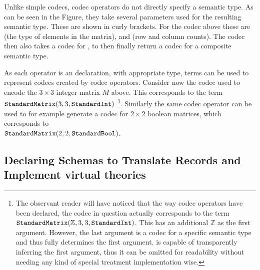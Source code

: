 Unlike simple codecs, codec operators do not directly specify a semantic type. 
As can be seen in the Figure, they take several parameters used for the resulting semantic type. 
These are shown in curly brackets. 
For the  codec above these are  (the type of elements in the matrix),  and  (row and column counts).
The codec then also takes a codec for , to then finally return a codec for a composite semantic type. 

As each operator is an \mmt declaration, with appropriate type, \mmt terms can be used to represent codecs created by codec operators. 
Consider now the codec used to encode the $3 \times 3$ integer matrix $M$ above. 
This corresponds to the \mmt term \\$\plaintt{StandardMatrix}(3, 3, \plaintt{StandardInt})$ \footnote{
  The observant reader will have noticed that the way codec operators have been declared, the codec in question actually corresponds to the term $\plaintt{StandardMatrix}(\mathbb{Z}, 3, 3, \plaintt{StandardInt})$. 
  This has an additional $\mathbb{Z}$ as the first argument. 
  However, the last argument is a codec for a specific semantic type and thus fully determines the first argument. 
  \mmt is capable of transparently inferring the first argument, thus it can be omitted for readability without needing any kind of special treatment implementation wise.  
}. 
Similarly the same codec operator can be used to for example generate a codec for $2 \times 2$ boolean matrices, which corresponds to 
\\$\plaintt{StandardMatrix}(2, 2, \plaintt{StandardBool})$. 

\subsection{Declaring Schemas to Translate Records and Implement virtual theories}\label{sec:vt:schemas}


